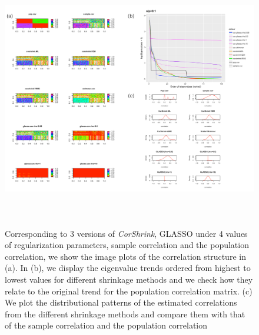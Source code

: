 \begin{figure}[ht]
\raggedleft
\includegraphics[height=4.5in, width=7in]{../figures/paper_figures/figure1.pdf}
 \caption{\small{Corresponding to 3 versions of \textit{CorShrink}, GLASSO under 4 values of regularization parameters, sample correlation and the population correlation, we show the image plots of the correlation structure in (a). In (b), we display the eigenvalue trends ordered from highest to lowest values for different shrinkage methods and we check how they relate to the original trend for the population correlation matrix. (c) We plot the distributional patterns of the estimated correlations from the different shrinkage methods and compare them with that of the sample correlation and the population correlation}}
\label{fig:fig1}
\end{figure}

